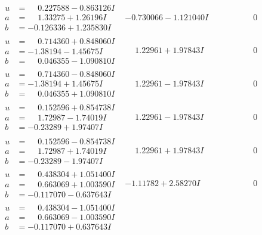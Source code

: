 \documentclass[1p]{elsarticle_modified}
\theoremstyle{definition}
\begin{document}
$$\begin{array}{c|c|c}
\begin{aligned}
u &= \phantom{-}0.227588 - 0.863126 I \\
a &= \phantom{-}1.33275 + 1.26196 I \\
b &= -0.126336 + 1.235830 I\end{aligned}
 & -0.730066 - 1.121040 I & \phantom{-0.000000 } 0 \\ \hline\begin{aligned}
u &= \phantom{-}0.714360 + 0.848060 I \\
a &= -1.38194 - 1.45675 I \\
b &= \phantom{-}0.046355 - 1.090810 I\end{aligned}
 & \phantom{-}1.22961 + 1.97843 I & \phantom{-0.000000 } 0 \\ \hline\begin{aligned}
u &= \phantom{-}0.714360 - 0.848060 I \\
a &= -1.38194 + 1.45675 I \\
b &= \phantom{-}0.046355 + 1.090810 I\end{aligned}
 & \phantom{-}1.22961 - 1.97843 I & \phantom{-0.000000 } 0 \\ \hline\begin{aligned}
u &= \phantom{-}0.152596 + 0.854738 I \\
a &= \phantom{-}1.72987 - 1.74019 I \\
b &= -0.23289 + 1.97407 I\end{aligned}
 & \phantom{-}1.22961 - 1.97843 I & \phantom{-0.000000 } 0 \\ \hline\begin{aligned}
u &= \phantom{-}0.152596 - 0.854738 I \\
a &= \phantom{-}1.72987 + 1.74019 I \\
b &= -0.23289 - 1.97407 I\end{aligned}
 & \phantom{-}1.22961 + 1.97843 I & \phantom{-0.000000 } 0 \\ \hline\begin{aligned}
u &= \phantom{-}0.438304 + 1.051400 I \\
a &= \phantom{-}0.663069 + 1.003590 I \\
b &= -0.117070 - 0.637643 I\end{aligned}
 & -1.11782 + 2.58270 I & \phantom{-0.000000 } 0 \\ \hline\begin{aligned}
u &= \phantom{-}0.438304 - 1.051400 I \\
a &= \phantom{-}0.663069 - 1.003590 I \\
b &= -0.117070 + 0.637643 I\end{aligned}

\end{array}$$
\end{document}
